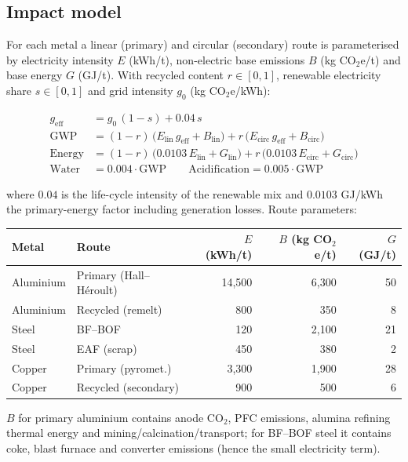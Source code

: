 \documentclass[11pt,a4paper]{article}
\begin{document}
\subsection{Impact model}
For each metal a linear (primary) and circular (secondary) route is parameterised by
electricity intensity $E$ (kWh/t), non-electric base emissions $B$ (kg CO$_2$e/t) and base
energy $G$ (GJ/t). With recycled content $r \in [0,1]$, renewable electricity share
$s \in [0,1]$ and grid intensity $g_0$ (kg CO$_2$e/kWh):

\begin{align}
g_{\mathrm{eff}} &= g_0\,(1-s) + 0.04\,s\\
\mathrm{GWP} &= (1-r)\,\big(E_{\mathrm{lin}}\, g_{\mathrm{eff}} + B_{\mathrm{lin}}\big)
              + r\,\big(E_{\mathrm{circ}}\, g_{\mathrm{eff}} + B_{\mathrm{circ}}\big)\\
\mathrm{Energy} &= (1-r)\,\big(0.0103\,E_{\mathrm{lin}} + G_{\mathrm{lin}}\big)
                 + r\,\big(0.0103\,E_{\mathrm{circ}} + G_{\mathrm{circ}}\big)\\
\mathrm{Water} &= 0.004 \cdot \mathrm{GWP} \qquad
\mathrm{Acidification} = 0.005 \cdot \mathrm{GWP}
\end{align}

where $0.04$ is the life-cycle intensity of the renewable mix and $0.0103$ GJ/kWh the
primary-energy factor including generation losses. Route parameters:

\begin{center}
\begin{tabular}{@{}llrrr@{}}
\toprule
\textbf{Metal} & \textbf{Route} & $E$ (kWh/t) & $B$ (kg CO$_2$e/t) & $G$ (GJ/t) \\
\midrule
Aluminium & Primary (Hall--H\'eroult) & 14{,}500 & 6{,}300 & 50 \\
Aluminium & Recycled (remelt)         & 800      & 350     & 8  \\
Steel     & BF--BOF                   & 120      & 2{,}100 & 21 \\
Steel     & EAF (scrap)               & 450      & 380     & 2  \\
Copper    & Primary (pyromet.)        & 3{,}300  & 1{,}900 & 28 \\
Copper    & Recycled (secondary)      & 900      & 500     & 6  \\
\bottomrule
\end{tabular}
\end{center}

$B$ for primary aluminium contains anode CO$_2$, PFC emissions, alumina refining thermal
energy and mining/calcination/transport; for BF--BOF steel it contains coke, blast furnace
and converter emissions (hence the small electricity term).
\end{document}
